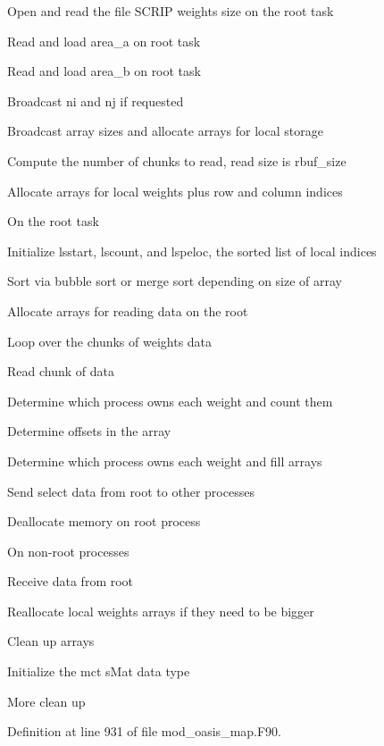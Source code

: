 \begin{DoxyItemize}
\item Open and read the file S\+C\+R\+IP weights size on the root task
\item Read and load area\+\_\+a on root task
\item Read and load area\+\_\+b on root task
\item Broadcast ni and nj if requested
\item Broadcast array sizes and allocate arrays for local storage
\item Compute the number of chunks to read, read size is rbuf\+\_\+size
\item Allocate arrays for local weights plus row and column indices
\item On the root task
\begin{DoxyItemize}
\item Initialize lsstart, lscount, and lspeloc, the sorted list of local indices
\item Sort via bubble sort or merge sort depending on size of array
\item Allocate arrays for reading data on the root
\item Loop over the chunks of weights data
\item Read chunk of data
\item Determine which process owns each weight and count them
\item Determine offsets in the array
\item Determine which process owns each weight and fill arrays
\item Send select data from root to other processes
\item Deallocate memory on root process
\end{DoxyItemize}
\item On non-\/root processes
\begin{DoxyItemize}
\item Receive data from root
\item Reallocate local weights arrays if they need to be bigger
\end{DoxyItemize}
\item Clean up arrays
\item Initialize the mct s\+Mat data type
\item More clean up 
\end{DoxyItemize}

Definition at line 931 of file mod\+\_\+oasis\+\_\+map.\+F90.


